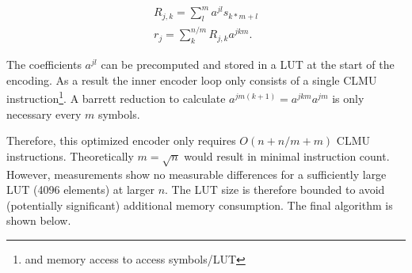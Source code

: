\documentclass[
]{article}
\begin{document}
\begin{gather}
R_{j,k} = \sum_l^m a^{jl} s_{k*m+l}\\
r_j = \sum_k^{n/m} R_{j,k} a^{jkm}.
\end{gather}

The coefficients \(a^{jl}\) can be precomputed and stored in a LUT at
the start of the encoding. As a result the inner encoder loop only
consists of a single CLMU instruction\footnote{and memory access to access symbols/LUT}. A barrett reduction to calculate \(a^{jm(k + 1)} = a^{jkm} a^{jm}\) is only necessary every
$m$ symbols.

Therefore, this optimized encoder only requires \(O(n + n/m + m)\)
CLMU instructions. Theoretically \(m = \sqrt{n}\) would result in
minimal instruction count. However, measurements show no measurable
differences for a sufficiently large LUT (4096 elements) at larger
\(n\). The LUT size is therefore bounded to avoid (potentially
significant) additional memory consumption. The final algorithm is shown
below.
\end{document}
